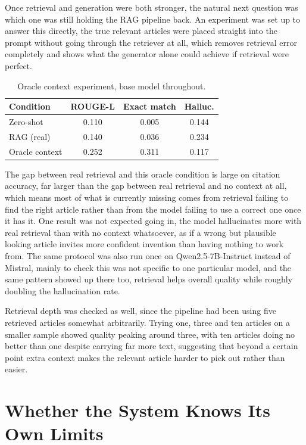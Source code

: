 \documentclass[11pt, a4paper]{article}
\begin{document}
Once retrieval and generation were both stronger, the natural next question was which one was still holding the RAG pipeline back. An experiment was set up to answer this directly, the true relevant articles were placed straight into the prompt without going through the retriever at all, which removes retrieval error completely and shows what the generator alone could achieve if retrieval were perfect.

\begin{table}[H]
\centering
\small
\begin{tabular}{lccc}
\toprule
\textbf{Condition} & \textbf{ROUGE-L} & \textbf{Exact match} & \textbf{Halluc.} \\
\midrule
Zero-shot & 0.110 & 0.005 & 0.144 \\
RAG (real) & 0.140 & 0.036 & 0.234 \\
Oracle context & 0.252 & 0.311 & 0.117 \\
\bottomrule
\end{tabular}
\caption{Oracle context experiment, base model throughout.}
\label{tab:oracle}
\end{table}

The gap between real retrieval and this oracle condition is large on citation accuracy, far larger than the gap between real retrieval and no context at all, which means most of what is currently missing comes from retrieval failing to find the right article rather than from the model failing to use a correct one once it has it. One result was not expected going in, the model hallucinates more with real retrieval than with no context whatsoever, as if a wrong but plausible looking article invites more confident invention than having nothing to work from. The same protocol was also run once on Qwen2.5-7B-Instruct instead of Mistral, mainly to check this was not specific to one particular model, and the same pattern showed up there too, retrieval helps overall quality while roughly doubling the hallucination rate.

Retrieval depth was checked as well, since the pipeline had been using five retrieved articles somewhat arbitrarily. Trying one, three and ten articles on a smaller sample showed quality peaking around three, with ten articles doing no better than one despite carrying far more text, suggesting that beyond a certain point extra context makes the relevant article harder to pick out rather than easier.

\section{Whether the System Knows Its Own Limits}
\end{document}
